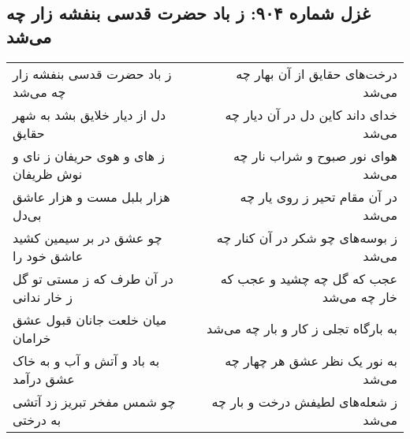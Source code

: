 \begin{center}
\section*{غزل شماره ۹۰۴: ز باد حضرت قدسی بنفشه زار چه می‌شد}
\label{sec:0904}
\begin{longtable}{l p{0.5cm} r}
ز باد حضرت قدسی بنفشه زار چه می‌شد
&&
درخت‌های حقایق از آن بهار چه می‌شد
\\
دل از دیار خلایق بشد به شهر حقایق
&&
خدای داند کاین دل در آن دیار چه می‌شد
\\
ز های و هوی حریفان ز نای و نوش ظریفان
&&
هوای نور صبوح و شراب نار چه می‌شد
\\
هزار بلبل مست و هزار عاشق بی‌دل
&&
در آن مقام تحیر ز روی یار چه می‌شد
\\
چو عشق در بر سیمین کشید عاشق خود را
&&
ز بوسه‌های چو شکر در آن کنار چه می‌شد
\\
در آن طرف که ز مستی تو گل ز خار ندانی
&&
عجب که گل چه چشید و عجب که خار چه می‌شد
\\
میان خلعت جانان قبول عشق خرامان
&&
به بارگاه تجلی ز کار و بار چه می‌شد
\\
به باد و آتش و آب و به خاک عشق درآمد
&&
به نور یک نظر عشق هر چهار چه می‌شد
\\
چو شمس مفخر تبریز زد آتشی به درختی
&&
ز شعله‌های لطیفش درخت و بار چه می‌شد
\\
\end{longtable}
\end{center}
